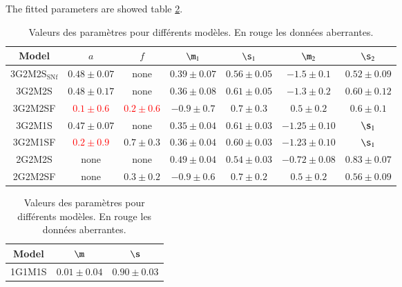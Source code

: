 \documentclass[]{aa} %
\begin{document}
The fitted parameters are showed table \ref{tab:val}.

\begin{table}[htbp!]
    \centering
    \caption{Valeurs des paramètres pour différents modèles. En rouge les
    données aberrantes.}
    \label{tab:val}
    \begin{tabular}{c c c c c c c}\hline\hline

        Model & $a$ & $f$ & $\m_1$ & $\s_1$ & $\m_2$ &
        $\s_2$ \\\hline

        3G2M2S$_{\mathrm{SNf}}$ & $0.48 \pm 0.07$ & none & $0.39 \pm 0.07$ &
        $0.56 \pm 0.05$ & $-1.5 \pm 0.1$ & $0.52 \pm 0.09$ \\

        3G2M2S & $0.48 \pm 0.17$ & none & $0.36 \pm 0.08$ & $0.61 \pm 0.05$ &
        $-1.3 \pm 0.2$ & $0.60 \pm 0.12$ \\

        3G2M2SF & \textcolor{red}{$0.1 \pm 0.6$} & \textcolor{red}{$0.2 \pm
        0.6$} & $-0.9 \pm 0.7$ & $0.7 \pm 0.3$ & $0.5 \pm 0.2$ & $0.6 \pm 0.1$
        \\

        3G2M1S & $0.47 \pm 0.07$ & none & $0.35 \pm 0.04$ & $0.61 \pm 0.03$ &
        $-1.25 \pm 0.10$ & $\s_1$ \\

        3G2M1SF & \textcolor{red}{$0.2 \pm 0.9$} & $0.7 \pm 0.3$ & $0.36 \pm
        0.04$ & $0.60 \pm 0.03$ & $-1.23 \pm 0.10$ & $\s_1$ \\

        2G2M2S & none & none & $0.49 \pm 0.04$ & $0.54 \pm 0.03$ & $-0.72 \pm
        0.08$ & $0.83 \pm 0.07$ \\
        
        2G2M2SF & none & $0.3 \pm 0.2$ & $-0.9 \pm 0.6$ & $0.7 \pm 0.2$ & $0.5
        \pm 0.2$ & $0.56 \pm 0.09$ \\\hline

    \end{tabular} \bigbreak

\begin{tabular}{c c c}\hline\hline

    Model & $\m$ & $\s$ \\\hline

    1G1M1S & $0.01 \pm 0.04$ & $0.90 \pm 0.03$ \\\hline

\end{tabular} \bigbreak


\end{table}
\end{document}
